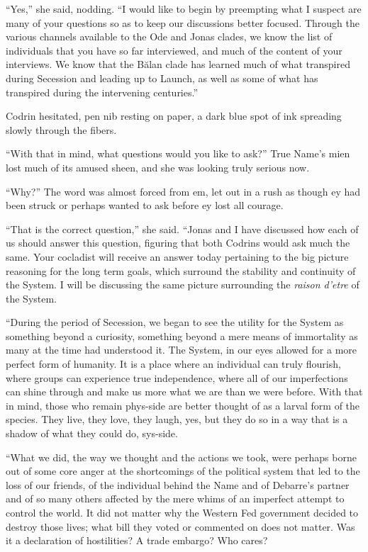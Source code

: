 ``Yes,'' she said, nodding. ``I would like to begin by preempting what I suspect are many of your questions so as to keep our discussions better focused. Through the various channels available to the Ode and Jonas clades, we know the list of individuals that you have so far interviewed, and much of the content of your interviews. We know that the Bălan clade has learned much of what transpired during Secession and leading up to Launch, as well as some of what has transpired during the intervening centuries.''

Codrin hesitated, pen nib resting on paper, a dark blue spot of ink spreading slowly through the fibers.

``With that in mind, what questions would you like to ask?'' True Name's mien lost much of its amused sheen, and she was looking truly serious now.

``Why?'' The word was almost forced from em, let out in a rush as though ey had been struck or perhaps wanted to ask before ey lost all courage.

``That is the correct question,'' she said. ``Jonas and I have discussed how each of us should answer this question, figuring that both Codrins would ask much the same. Your cocladist will receive an answer today pertaining to the big picture reasoning for the long term goals, which surround the stability and continuity of the System. I will be discussing the same picture surrounding the \emph{raison d'etre} of the System.

``During the period of Secession, we began to see the utility for the System as something beyond a curiosity, something beyond a mere means of immortality as many at the time had understood it. The System, in our eyes allowed for a more perfect form of humanity. It is a place where an individual can truly flourish, where groups can experience true independence, where all of our imperfections can shine through and make us more what we are than we were before. With that in mind, those who remain phys-side are better thought of as a larval form of the species. They live, they love, they laugh, yes, but they do so in a way that is a shadow of what they could do, sys-side.

``What we did, the way we thought and the actions we took, were perhaps borne out of some core anger at the shortcomings of the political system that led to the loss of our friends, of the individual behind the Name and of Debarre's partner and of so many others affected by the mere whims of an imperfect attempt to control the world. It did not matter why the Western Fed government decided to destroy those lives; what bill they voted or commented on does not matter. Was it a declaration of hostilities? A trade embargo? Who cares?

